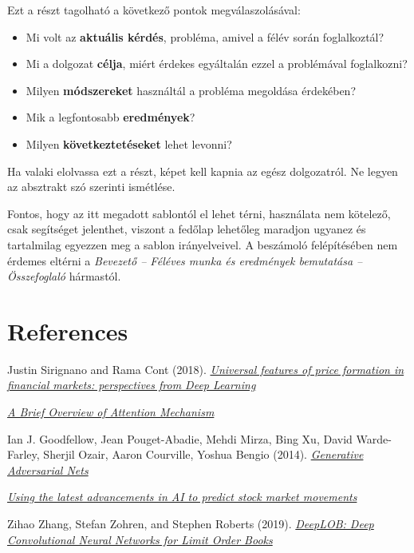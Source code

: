 \documentclass[11pt,a4paper,oneside]{article}
\begin{document}
Ezt a részt tagolható a következő pontok megválaszolásával:
\begin{itemize}
\item Mi volt az \textbf{aktuális kérdés}, probléma, amivel a félév
  során foglalkoztál?
\item Mi a dolgozat \textbf{célja}, miért érdekes egyáltalán ezzel a
  problémával foglalkozni?
\item Milyen \textbf{módszereket} használtál a probléma megoldása
  érdekében?
\item Mik a legfontosabb \textbf{eredmények}?
\item Milyen \textbf{következtetéseket} lehet levonni?

\end{itemize}

Ha valaki elolvassa ezt a részt, képet kell kapnia az egész
dolgozatról.  Ne legyen az absztrakt szó szerinti ismétlése.

Fontos, hogy az itt megadott sablontól el lehet térni, használata nem
kötelező, csak segítséget jelenthet, viszont a fedőlap lehetőleg
maradjon ugyanez és tartalmilag egyezzen meg a sablon irányelveivel. A
beszámoló felépítésében nem érdemes eltérni a \emph{Bevezető --
  Féléves munka és eredmények bemutatása -- Összefoglaló} hármastól.

\newpage
\section{References}
\label{sec:irod-es-csatl}

\begin{references}{9}
\label{sec:tanulm-irod-jegyz}

 Justin Sirignano and Rama Cont (2018). \emph{
\href{https://arxiv.org/abs/1803.06917.pdf}{Universal features of price formation in financial markets: perspectives from Deep Learning}}

 \emph{\href{https://medium.com/syncedreview/a-brief-overview-of-attention-mechanism-13c578ba9129}{A Brief Overview of Attention Mechanism}}

 Ian J. Goodfellow, Jean Pouget-Abadie, Mehdi Mirza, Bing Xu, David Warde-Farley, Sherjil Ozair, Aaron Courville, Yoshua Bengio (2014). \emph{
\href{http://papers.nips.cc/paper/5423-generative-adversarial-nets.pdf}{Generative Adversarial Nets}}

 \emph{\href{https://github.com/borisbanushev/stockpredictionai}{Using the latest advancements in AI to predict stock market movements}}

 Zihao Zhang, Stefan Zohren, and Stephen Roberts (2019). \emph{
\href{https://arxiv.org/abs/1803.06917.pdf}{DeepLOB: Deep Convolutional Neural Networks for Limit Order Books}}

\end{references}
\end{document}
